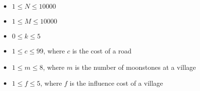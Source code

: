 \begin{itemize}
\tightlist
\item $1 \leq N \leq 10000$
\item $1 \leq M \leq 10000$
\item $0 \leq k \leq 5$
\item $1 \leq c \leq 99$, where $c$ is the cost of a road
\item $1 \leq m \leq 8$, where $m$ is the number of moonstones at a village
\item $1 \leq f \leq 5$, where $f$ is the influence cost of a village
\end{itemize}
